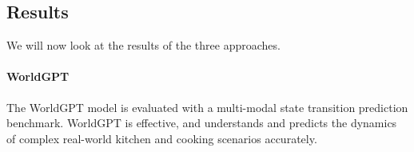 \subsection{Results}
We will now look at the results of the three approaches. 

\paragraph{WorldGPT} The WorldGPT model is evaluated with a multi-modal state transition prediction benchmark. WorldGPT is effective, and understands and predicts the dynamics of complex real-world kitchen and cooking scenarios accurately. 

